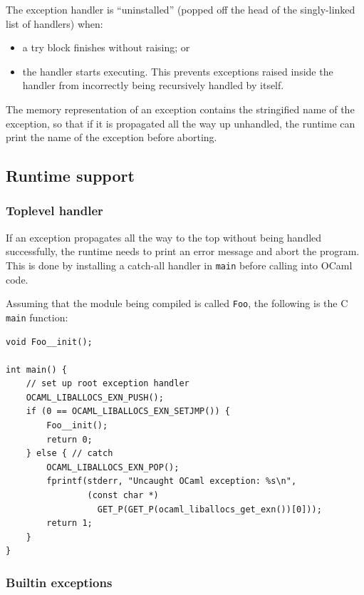 \documentclass[12pt,a4paper,twoside,openright]{report}
\begin{document}
The exception handler is ``uninstalled'' (popped off the head of the
singly-linked list of handlers) when:
\begin{itemize}
  \item a try block finishes without raising; or
  \item the handler starts executing. This prevents exceptions raised inside the
      handler from incorrectly being recursively handled by itself.
\end{itemize}

The memory representation of an exception contains the stringified name of the
exception, so that if it is propagated all the way up unhandled, the runtime
can print the name of the exception before aborting.

\subsection{Runtime support}\label{exceptions-runtime-support}

\subsubsection{Toplevel handler}

If an exception propagates all the way to the top without being handled
successfully, the runtime needs to print an error message and abort the
program. This is done by installing a catch-all handler in \lstinline!main! before
calling into OCaml code.

Assuming that the module being compiled is called \lstinline!Foo!, the
following is the C \lstinline!main! function:

\begin{lstlisting}
void Foo__init();

int main() {
    // set up root exception handler
    OCAML_LIBALLOCS_EXN_PUSH();
    if (0 == OCAML_LIBALLOCS_EXN_SETJMP()) {
        Foo__init();
        return 0;
    } else { // catch
        OCAML_LIBALLOCS_EXN_POP();
        fprintf(stderr, "Uncaught OCaml exception: %s\n",
                (const char *)
                  GET_P(GET_P(ocaml_liballocs_get_exn())[0]));
        return 1;
    }
}
\end{lstlisting}

\subsubsection{Builtin exceptions}\label{builtin-exceptions}
\end{document}
